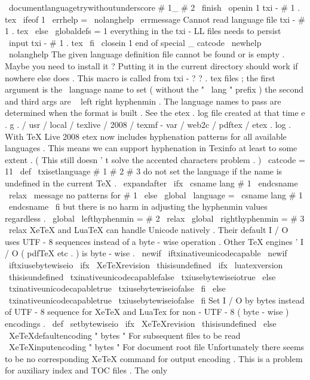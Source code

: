 {{{{{\
documentlanguagetrywithoutunderscore
#
1_
#
2
\
finish
{
%
\
openin
1
txi
-
#
1
.
tex
\
ifeof
1
\
errhelp
=
\
nolanghelp
\
errmessage
{
Cannot
read
language
file
txi
-
#
1
.
tex
}
%
\
else
\
globaldefs
=
1
%
everything
in
the
txi
-
LL
files
needs
to
persist
\
input
txi
-
#
1
.
tex
\
fi
\
closein
1
}
}
%
end
of
special
_
catcode
%
\
newhelp
\
nolanghelp
{
The
given
language
definition
file
cannot
be
found
or
is
empty
.
Maybe
you
need
to
install
it
?
Putting
it
in
the
current
directory
should
work
if
nowhere
else
does
.
}
%
This
macro
is
called
from
txi
-
?
?
.
tex
files
;
the
first
argument
is
the
%
\
language
name
to
set
(
without
the
"
\
lang
"
prefix
)
the
second
and
%
third
args
are
\
{
left
right
}
hyphenmin
.
%
%
The
language
names
to
pass
are
determined
when
the
format
is
built
.
%
See
the
etex
.
log
file
created
at
that
time
e
.
g
.
%
/
usr
/
local
/
texlive
/
2008
/
texmf
-
var
/
web2c
/
pdftex
/
etex
.
log
.
%
%
With
TeX
Live
2008
etex
now
includes
hyphenation
patterns
for
all
%
available
languages
.
This
means
we
can
support
hyphenation
in
%
Texinfo
at
least
to
some
extent
.
(
This
still
doesn
'
t
solve
the
%
accented
characters
problem
.
)
%
\
catcode
=
11
\
def
\
txisetlanguage
#
1
#
2
#
3
{
%
%
do
not
set
the
language
if
the
name
is
undefined
in
the
current
TeX
.
\
expandafter
\
ifx
\
csname
lang
#
1
\
endcsname
\
relax
\
message
{
no
patterns
for
#
1
}
%
\
else
\
global
\
language
=
\
csname
lang
#
1
\
endcsname
\
fi
%
but
there
is
no
harm
in
adjusting
the
hyphenmin
values
regardless
.
\
global
\
lefthyphenmin
=
#
2
\
relax
\
global
\
righthyphenmin
=
#
3
\
relax
}
%
XeTeX
and
LuaTeX
can
handle
Unicode
natively
.
%
Their
default
I
/
O
uses
UTF
-
8
sequences
instead
of
a
byte
-
wise
operation
.
%
Other
TeX
engines
'
I
/
O
(
pdfTeX
etc
.
)
is
byte
-
wise
.
%
\
newif
\
iftxinativeunicodecapable
\
newif
\
iftxiusebytewiseio
\
ifx
\
XeTeXrevision
\
thisisundefined
\
ifx
\
luatexversion
\
thisisundefined
\
txinativeunicodecapablefalse
\
txiusebytewiseiotrue
\
else
\
txinativeunicodecapabletrue
\
txiusebytewiseiofalse
\
fi
\
else
\
txinativeunicodecapabletrue
\
txiusebytewiseiofalse
\
fi
%
Set
I
/
O
by
bytes
instead
of
UTF
-
8
sequence
for
XeTeX
and
LuaTex
%
for
non
-
UTF
-
8
(
byte
-
wise
)
encodings
.
%
\
def
\
setbytewiseio
{
%
\
ifx
\
XeTeXrevision
\
thisisundefined
\
else
\
XeTeXdefaultencoding
"
bytes
"
%
For
subsequent
files
to
be
read
\
XeTeXinputencoding
"
bytes
"
%
For
document
root
file
%
Unfortunately
there
seems
to
be
no
corresponding
XeTeX
command
for
%
output
encoding
.
This
is
a
problem
for
auxiliary
index
and
TOC
files
.
%
The
only
}}}}}
